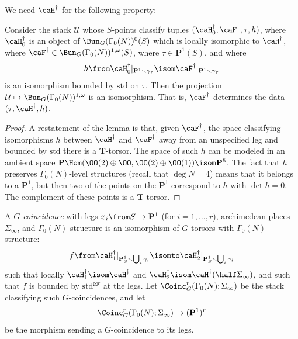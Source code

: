 \documentclass{article}
\def\PP{\mathbf{P}}
\def\P{\mathbf{P}}
\begin{document}
We need $\caH^{\dagger}$ for the following property:

\begin{lm}  \label{LemmaMapFromH}  Consider the stack $\mathcal{U}$ whose $S$-points classify tuples $(\caH^\dagger_0,\caF^\dagger,\tau,h)$, where $\caH^\dagger_0$ is an object of $\Bun_G(\Gamma_0(N))^0(S)$ which is locally isomorphic to $\caH^\dagger$, where $\caF^\dagger\in \Bun_G(\Gamma_0(N))^{1,\omega}(S)$, where $\tau\in\P^1(S)$, and where 
\[h\from\caH_0^\dagger\vert_{\P^1\smallsetminus\gamma_{\tau}}\isom \caF^\dagger\vert_{\P^1\smallsetminus\gamma_{\tau}}\]
is an isomorphism bounded by $\mathrm{std}$ on $\tau$.  Then the projection $\mathcal{U}\mapsto \Bun_G(\Gamma_0(N))^{1,\omega}$ is an isomorphism.  That is, $\caF^\dagger$ determines the data $(\tau,\caH^\dagger,h)$.
\end{lm}

\begin{proof}  A restatement of the lemma is that, given $\caF^\dagger$, the space classifying isomorphisms $h$ between $\caH^\dagger$ and $\caF^\dagger$ away from an unspecified leg and bounded by $\mathrm{std}$ there is a $\mathbf{T}$-torsor.  The space of such $h$ can be modeled in an ambient space $\P\Hom(\OO(2)\oplus \OO, \OO(2)\oplus\OO(1))\isom \P^5$.  The fact that $h$ preserves $\Gamma_0(N)$-level structures (recall that $\deg N = 4$) means that it belongs to a $\P^1$, but then two of the points on the $\P^1$ correspond to $h$ with $\det h=0$.  The complement of these points is a $\mathbf{T}$-torsor. 
\end{proof}


\begin{defn}\label{DefnGCoincidences} A {\em $G$-coincidence} with legs $x_i\from S\to \P^1$ (for $i=1,\dots,r$), archimedean places $\Sigma_\infty$, and $\Gamma_0(N)$-structure is an isomorphism of $G$-torsors with $\Gamma_0(N)$-structure:
\[ f\from \caH_1^{\dagger}\vert_{\PP^1_S\smallsetminus \bigcup_i \gamma_i } \isomto \caH_2^{\dagger}\vert_{\PP^1_S\smallsetminus \bigcup_i \gamma_i} \]
such that locally $\caH_1^\dagger \isom \caH^\dagger$ and $\caH_2^\dagger \isom \caH^\dagger(\half \Sigma_\infty)$, and such that $f$ is bounded by $\mathrm{std}^{\boxtimes r}$ at the legs.  Let $\Coinc^{r}_G(\Gamma_0(N);\Sigma_\infty)$ be the stack classifying such $G$-coincidences, and let
\[ \Coinc^{r}_G(\Gamma_0(N);\Sigma_\infty)\to (\P^1)^r \]
be the morphism sending a $G$-coincidence to its legs.
\end{defn}
\end{document}
